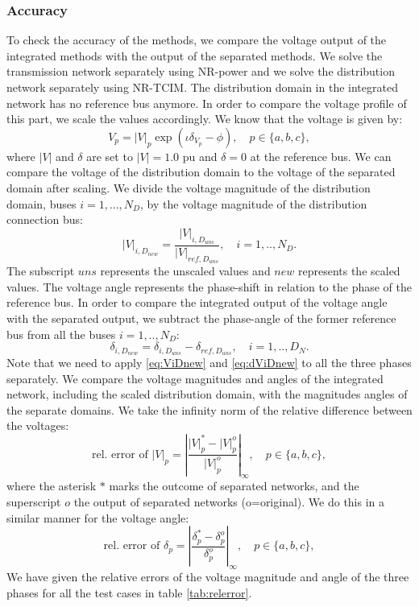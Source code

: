 \subsubsection{Accuracy} 
To check the accuracy of the methods, we compare the voltage output of the integrated methods with the output of the separated methods. We solve the transmission network separately using NR-power and we solve the distribution network separately using NR-TCIM. The distribution domain in the integrated network has no reference bus anymore. In order to compare the voltage profile of this part, we scale the values accordingly. 
We know that the voltage is given by: \begin{equation}
V_p=|V|_p\exp{(\iota\delta_{V_p}-\phi)},\quad p\in\{a,b,c\},
\end{equation}
where $|V|$ and $\delta$ are set to $|V|=1.0$ pu and $\delta=0$ at the reference bus. We can compare the voltage of the distribution domain to the voltage of the separated domain after scaling. We divide the voltage magnitude of the distribution domain, buses $i=1,...,N_D$, by the voltage magnitude of the distribution connection bus: 
\begin{equation}
|V|_{i,{D_{new}}} = \frac{|V|_{i,{D_{uns}}}}{|V|_{ref,{D_{uns}}}},\quad i=1,..,N_D.
\label{eq:ViDnew}
\end{equation}
The subscript $uns$ represents the unscaled values and $new$ represents the scaled values. \newline 
The voltage angle represents the phase-shift in relation to the phase of the reference bus. In order to compare the integrated output of the voltage angle with the separated output, we subtract the phase-angle of the former reference bus from all the buses $i=1,..,N_D$: 
\begin{equation}
\delta_{i,{D_{new}}} ={\delta_{i,{D_{uns}}}}-{\delta_{ref,{D_{uns}}}},\quad i=1,..,D_N.
\label{eq:dViDnew}
\end{equation}
Note that we need to apply \eqref{eq:ViDnew} and \eqref{eq:dViDnew} to all the three phases separately. \newline\newline
We compare the voltage magnitudes and angles of the integrated network, including the scaled distribution domain, with the magnitudes angles of the separate domains. We take the infinity norm of the relative difference between the voltages: 
\begin{equation}
\mbox{rel. error of } |V|_p = \left|\frac{|V|^*_p - |V|^o_p}{|V|^o_p}\right|_\infty,\quad p\in\{a,b,c\},
\label{eq:norm|V|}
\end{equation}
where the asterisk $*$ marks the outcome of separated networks, and the superscript $o$ the output of separated networks (o=original). We do this in a similar manner for the voltage angle: 
\begin{equation}
\mbox{rel. error of } \delta_p = \left|\frac{\delta^*_p - \delta^o_p}{\delta^o_p}\right|_\infty,\quad p\in\{a,b,c\},
\label{eq:normdelta}
\end{equation}
We have given the relative errors of the voltage magnitude and angle of the three phases for all the test cases in table \ref{tab:relerror}. 

